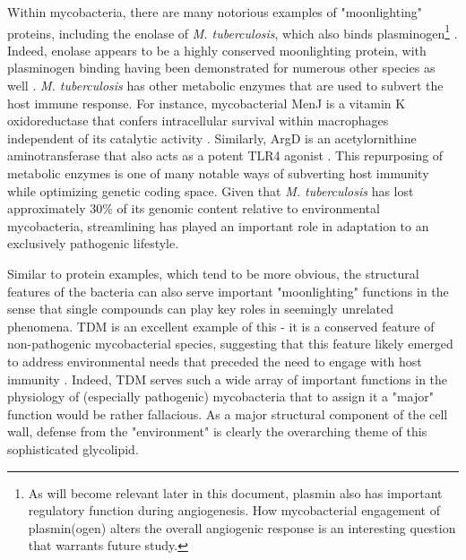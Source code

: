 Within mycobacteria, there are many notorious examples of "moonlighting" proteins, including the enolase of \textit{M. tuberculosis}, which also binds plasminogen\footnote{As will become relevant later in this document, plasmin also has important regulatory function during angiogenesis. How mycobacterial engagement of plasmin(ogen) alters the overall angiogenic response is an interesting question that warrants future study.} \citep{Rahi2017}. Indeed, enolase appears to be a highly conserved moonlighting protein, with plasminogen binding having been demonstrated for numerous other species as well \citep{Figueiredo2015, Seweryn2007, Candela2009, Floden2011, Vanegas2007, Agarwal2008}. \textit{M. tuberculosis} has other metabolic enzymes that are used to subvert the host immune response. For instance, mycobacterial MenJ is a vitamin K oxidoreductase that confers intracellular survival within macrophages independent of its catalytic activity \citep{Kumar2020b}. Similarly, ArgD is an acetylornithine aminotransferase that also acts as a potent TLR4 agonist \citep{Nehvi2022}. This repurposing of metabolic enzymes is one of many notable ways of subverting host immunity while optimizing genetic coding space. Given that \textit{M. tuberculosis} has lost approximately 30\% of its genomic content relative to environmental mycobacteria, streamlining has played an important role in adaptation to an exclusively pathogenic lifestyle. 

Similar to protein examples, which tend to be more obvious, the structural features of the bacteria can also serve important "moonlighting" functions in the sense that single compounds can play key roles in seemingly unrelated phenomena. TDM is an excellent example of this - it is a conserved feature of non-pathogenic mycobacterial species, suggesting that this feature likely emerged to address environmental needs that preceded the need to engage with host immunity \citep{Kremer2002, Pacheco2013}. Indeed, TDM serves such a wide array of important functions in the physiology of (especially pathogenic) mycobacteria that to assign it a "major" function would be rather fallacious. As a major structural component of the cell wall, defense from the "environment" is clearly the overarching theme of this sophisticated glycolipid. 

